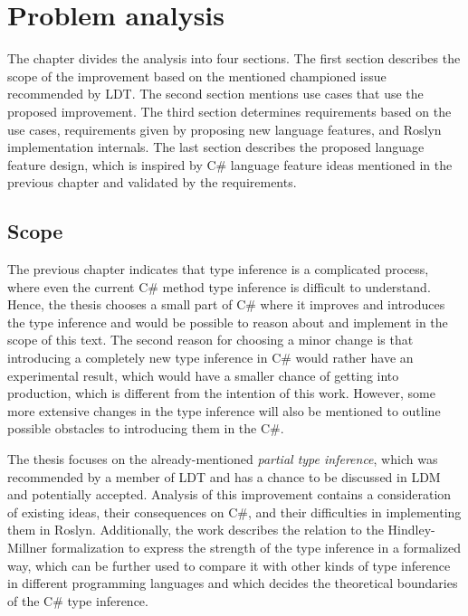 \chapter{Problem analysis}
The chapter divides the analysis into four sections. 
The first section describes the scope of the improvement based on the mentioned championed issue recommended by \ac{LDT}. 
The second section mentions use cases that use the proposed improvement. 
The third section determines requirements based on the use cases, requirements given by proposing new language features, and Roslyn implementation internals. 
The last section describes the proposed language feature design, which is inspired by C\# language feature ideas mentioned in the previous chapter and validated by the requirements.

\section{Scope}
The previous chapter indicates that type inference is a complicated process, where even the current C\# method type inference is difficult to understand. 
Hence, the thesis chooses a small part of C\# where it improves and introduces the type inference and would be possible to reason about and implement in the scope of this text. 
The second reason for choosing a minor change is that introducing a completely new type inference in C\# would rather have an experimental result, which would have a smaller chance of getting into production, which is different from the intention of this work. 
However, some more extensive changes in the type inference will also be mentioned to outline possible obstacles to introducing them in the C\#.
\par
{}
The thesis focuses on the already-mentioned \textit{partial type inference}, which was recommended by a member of \ac{LDT} and has a chance to be discussed in \ac{LDM} and potentially accepted. 
Analysis of this improvement contains a consideration of existing ideas, their consequences on C\#, and their difficulties in implementing them in Roslyn. 
Additionally, the work describes the relation to the Hindley-Millner formalization to express the strength of the type inference in a formalized way, which can be further used to compare it with other kinds of type inference in different programming languages and which decides the theoretical boundaries of the C\# type inference.

